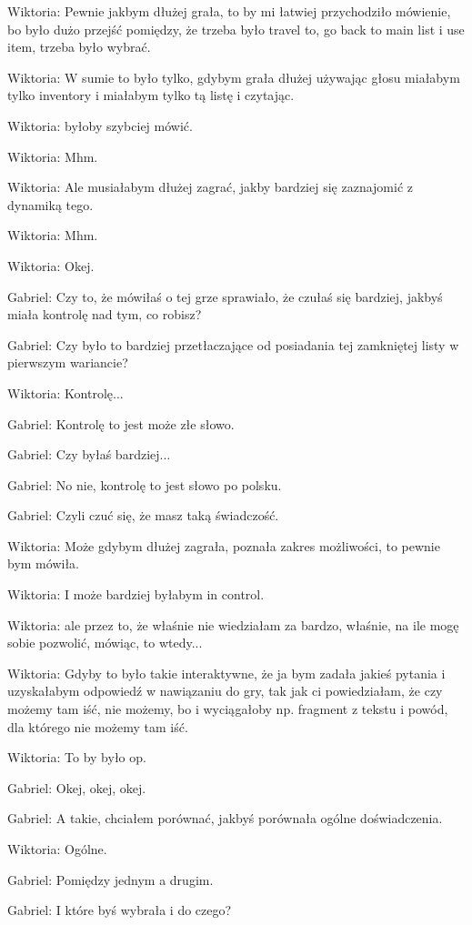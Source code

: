 Wiktoria: Pewnie jakbym dłużej grała, to by mi łatwiej przychodziło mówienie, bo było dużo przejść pomiędzy, że trzeba było travel to, go back to main list i use item, trzeba było wybrać.

Wiktoria: W sumie to było tylko, gdybym grała dłużej używając głosu miałabym tylko inventory i miałabym tylko tą listę i czytając.

Wiktoria: byłoby szybciej mówić.

Wiktoria: Mhm.

Wiktoria: Ale musiałabym dłużej zagrać, jakby bardziej się zaznajomić z dynamiką tego.

Wiktoria: Mhm.

Wiktoria: Okej.

Gabriel: Czy to, że mówiłaś o tej grze sprawiało, że czułaś się bardziej, jakbyś miała kontrolę nad tym, co robisz?

Gabriel: Czy było to bardziej przetłaczające od posiadania tej zamkniętej listy w pierwszym wariancie?

Wiktoria: Kontrolę...

Gabriel: Kontrolę to jest może złe słowo.

Gabriel: Czy byłaś bardziej...

Gabriel: No nie, kontrolę to jest słowo po polsku.

Gabriel: Czyli czuć się, że masz taką świadczość.

Wiktoria: Może gdybym dłużej zagrała, poznała zakres możliwości, to pewnie bym mówiła.

Wiktoria: I może bardziej byłabym in control.

Wiktoria: ale przez to, że właśnie nie wiedziałam za bardzo, właśnie, na ile mogę sobie pozwolić, mówiąc, to wtedy...

Wiktoria: Gdyby to było takie interaktywne, że ja bym zadała jakieś pytania i uzyskałabym odpowiedź w nawiązaniu do gry, tak jak ci powiedziałam, że czy możemy tam iść, nie możemy, bo i wyciągałoby np. fragment z tekstu i powód, dla którego nie możemy tam iść.

Wiktoria: To by było op.

Gabriel: Okej, okej, okej.

Gabriel: A takie, chciałem porównać, jakbyś porównała ogólne doświadczenia.

Wiktoria: Ogólne.

Gabriel: Pomiędzy jednym a drugim.

Gabriel: I które byś wybrała i do czego?


